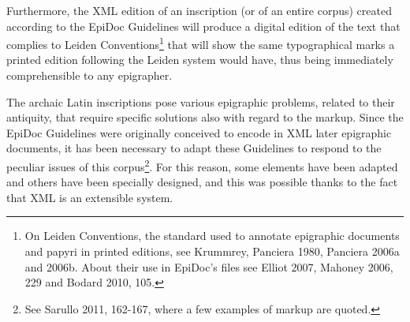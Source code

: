 \documentclass[amsthm,ebook]{saparticle}
\begin{document}
Furthermore, the XML edition of an inscription (or of an entire corpus) created according to the EpiDoc Guidelines will
produce a digital edition of the text that complies to Leiden Conventions\footnote{On Leiden Conventions, the standard
used to annotate epigraphic documents and papyri in printed editions, see Krummrey, Panciera 1980, Panciera 2006a and
2006b. About their use in EpiDoc’s files see Elliot 2007, Mahoney 2006, 229 and Bodard 2010, 105.} that will show the
same typographical marks a printed edition following the Leiden system would have, thus being immediately
comprehensible to any epigrapher.

The archaic Latin inscriptions pose various epigraphic problems, related to their antiquity, that require specific
solutions also with regard to the markup. Since the EpiDoc Guidelines were originally conceived to encode in XML later
epigraphic documents, it has been necessary to adapt these Guidelines to respond to the peculiar issues of this
corpus\footnote{See Sarullo 2011, 162-167, where a few examples of markup are quoted. }. For this reason, some elements
have been adapted and others have been specially designed, and this was possible thanks to the fact that XML is an
extensible system.
\end{document}
